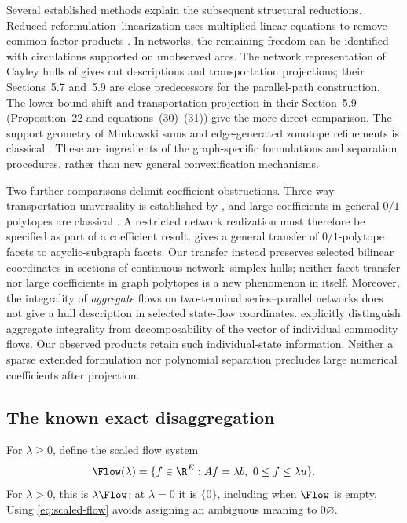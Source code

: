 Several established methods explain the subsequent structural reductions.
Reduced reformulation--linearization uses multiplied linear equations to
remove common-factor products \citep{LibertiPantelides2006}. In networks,
the remaining freedom can be identified with circulations supported on
unobserved arcs. The network representation of Cayley hulls of
\citet{KisHorvath2022} gives cut descriptions and transportation projections;
their Sections~5.7 and~5.9 are close predecessors for the parallel-path
construction. The lower-bound shift and transportation projection in their
Section~5.9 (Proposition~22 and equations~(30)--(31)) give the more direct
comparison.
The support geometry of Minkowski sums and edge-generated zonotope
refinements is classical \citep{GritzmannSturmfels1993,OnnRothblum2004}.
These are ingredients of the graph-specific formulations and separation
procedures, rather than new general convexification mechanisms.

Two further comparisons delimit coefficient obstructions. Three-way
transportation universality is established by \citet{DeLoeraOnn2006}, and
large coefficients in general $0/1$ polytopes are classical
\citep{AlonVu1997}. A restricted network realization must therefore be
specified as part of a coefficient result. \citet{Fiorini2006} gives a
general transfer of $0/1$-polytope facets to acyclic-subgraph facets.
Our transfer instead preserves selected bilinear coordinates in sections
of continuous network--simplex hulls; neither facet transfer nor large
coefficients in graph polytopes is a new phenomenon in itself.
Moreover, the integrality of
\emph{aggregate} flows on two-terminal series--parallel networks does not
give a hull description in selected state-flow coordinates.
\citet[Remark~1]{AlmoghrabiSkutellaWarode2026} explicitly distinguish
aggregate integrality from decomposability of the vector of individual
commodity flows. Our observed products retain such individual-state
information. Neither a sparse extended formulation nor polynomial separation
precludes large numerical coefficients after projection.

\subsection{The known exact disaggregation}\label{subsec:disaggregation}
For $\lambda\ge0$, define the scaled flow system
\begin{equation}\label{eq:scaled-flow}
 \Flow(\lambda)=\{f\in\R^E:Af=\lambda b,\ 0\le f\le\lambda u\}.
\end{equation}
For $\lambda>0$, this is $\lambda\Flow$; at $\lambda=0$ it is $\{0\}$,
including when $\Flow$ is empty. Using \eqref{eq:scaled-flow} avoids assigning
an ambiguous meaning to $0\varnothing$.

